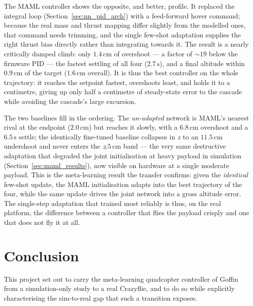 \documentclass[11pt,a4paper]{article}
\theoremstyle{remark}
\numberwithin{equation}{section}
\begin{document}
The MAML controller shows the opposite, and better, profile. It replaced the
integral loop (Section~\ref{sec:nn_pid_arch}) with a feed-forward hover command;
because the real mass and thrust mapping differ slightly from the modelled ones,
that command needs trimming, and the single few-shot adaptation supplies the right
thrust bias directly rather than integrating towards it. The result is a nearly
critically damped climb: only $1.4\,\mathrm{cm}$ of overshoot --- a factor of
$\sim\!19$ below the firmware PID --- the fastest settling of all four
($2.7\,\mathrm{s}$), and a final altitude within $0.9\,\mathrm{cm}$ of the target
($1.6\,\mathrm{cm}$ overall). It is thus the best controller on the whole
trajectory: it reaches the setpoint fastest, overshoots least, and holds it to a
centimetre, giving up only half a centimetre of steady-state error to the cascade
while avoiding the cascade's large excursion.

The two baselines fill in the ordering. The \emph{un-adapted} network is MAML's
nearest rival at the endpoint ($2.0\,\mathrm{cm}$) but reaches it slowly, with a
$6.8\,\mathrm{cm}$ overshoot and a $6.5\,\mathrm{s}$ settle; the identically
fine-tuned baseline collapses in $z$ to an $11.5\,\mathrm{cm}$ undershoot and never
enters the $\pm5\,\mathrm{cm}$ band --- the very same destructive adaptation that
degraded the joint initialisation at heavy payload in simulation
(Section~\ref{sec:maml_results}), now visible on hardware at a single moderate
payload. This is the meta-learning result the transfer confirms: given the
\emph{identical} few-shot update, the MAML initialisation adapts into the best
trajectory of the four, while the same update drives the joint network into a gross
altitude error. The single-step adaptation that trained most reliably is thus, on
the real platform, the difference between a controller that flies the payload
crisply and one that does not fly it at all.

\newpage
\section{Conclusion}

This project set out to carry the meta-learning quadcopter controller of
Goffin~\cite{goffin2026} from a simulation-only study to a real Crazyflie, and to
do so while explicitly characterising the sim-to-real gap that such a transition
exposes.
\end{document}
